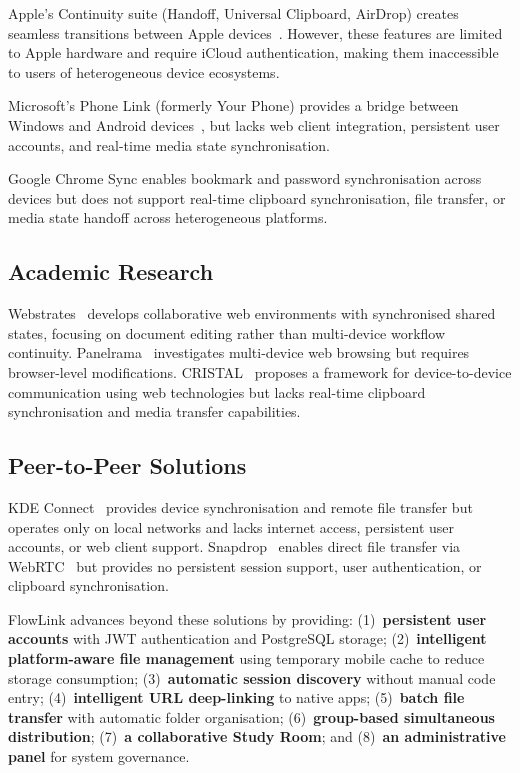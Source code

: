 \documentclass[conference]{IEEEtran}
\begin{document}
Apple's Continuity suite (Handoff, Universal Clipboard, AirDrop) creates seamless transitions between Apple devices~\cite{apple_continuity}. However, these features are limited to Apple hardware and require iCloud authentication, making them inaccessible to users of heterogeneous device ecosystems.

Microsoft's Phone Link (formerly Your Phone) provides a bridge between Windows and Android devices~\cite{microsoft_yourphone}, but lacks web client integration, persistent user accounts, and real-time media state synchronisation.

Google Chrome Sync enables bookmark and password synchronisation across devices but does not support real-time clipboard synchronisation, file transfer, or media state handoff across heterogeneous platforms.

\subsection{Academic Research}

Webstrates~\cite{webstrates} develops collaborative web environments with synchronised shared states, focusing on document editing rather than multi-device workflow continuity. Panelrama~\cite{panelrama} investigates multi-device web browsing but requires browser-level modifications. CRISTAL~\cite{cristal} proposes a framework for device-to-device communication using web technologies but lacks real-time clipboard synchronisation and media transfer capabilities.

\subsection{Peer-to-Peer Solutions}

KDE Connect~\cite{kdeconnect} provides device synchronisation and remote file transfer but operates only on local networks and lacks internet access, persistent user accounts, or web client support. Snapdrop~\cite{snapdrop} enables direct file transfer via WebRTC~\cite{webrtc} but provides no persistent session support, user authentication, or clipboard synchronisation.

FlowLink advances beyond these solutions by providing: (1)~\textbf{persistent user accounts} with JWT authentication and PostgreSQL storage; (2)~\textbf{intelligent platform-aware file management} using temporary mobile cache to reduce storage consumption; (3)~\textbf{automatic session discovery} without manual code entry; (4)~\textbf{intelligent URL deep-linking} to native apps; (5)~\textbf{batch file transfer} with automatic folder organisation; (6)~\textbf{group-based simultaneous distribution}; (7)~\textbf{a collaborative Study Room}; and (8)~\textbf{an administrative panel} for system governance.
\end{document}
